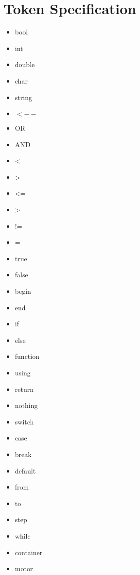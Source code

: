 \section{Token Specification}

\begin{itemize}

\item bool
\item int
\item double
\item char
\item string
\item $<--$
\item OR
\item AND
\item <
\item >
\item <=
\item >=
\item !=
\item =
\item true
\item false
\item begin
\item end
\item if
\item else
\item function
\item using
\item return
\item nothing
\item switch
\item case
\item break
\item default
\item from
\item to
\item step
\item while



\item container
\item motor
\end{itemize}